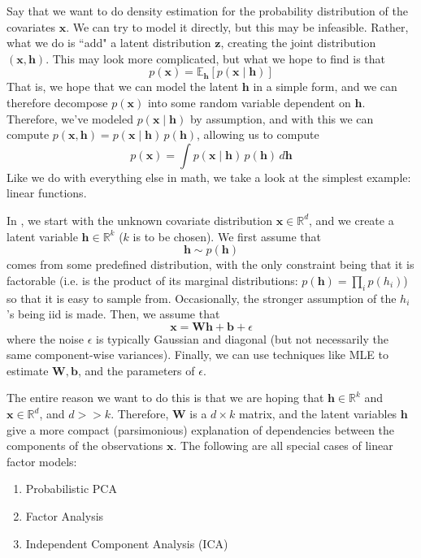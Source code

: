 \documentclass{article}
\theoremstyle{definition}
\theoremstyle{remark}
\theoremstyle{definition}
\begin{document}
        Say that we want to do density estimation for the probability distribution of the covariates $\mathbf{x}$. We can try to model it directly, but this may be infeasible. Rather, what we do is ``add" a latent distribution $\mathbf{z}$, creating the joint distribution $(\mathbf{x}, \mathbf{h})$. This may look more complicated, but what we hope to find is that 
        \[p(\mathbf{x}) = \mathbb{E}_{\mathbf{h}} [ p(\mathbf{x} \mid \mathbf{h})]\]
        That is, we hope that we can model the latent $\mathbf{h}$ in a simple form, and we can therefore decompose $p(\mathbf{x})$ into some random variable dependent on $\mathbf{h}$. Therefore, we've modeled $p(\mathbf{x} \mid \mathbf{h})$ by assumption, and with this we can compute $p(\mathbf{x}, \mathbf{h}) = p( \mathbf{x} \mid \mathbf{h}) \, p( \mathbf{h})$, allowing us to compute 
        \[p( \mathbf{x}) = \int p(\mathbf{x} \mid \mathbf{h}) \, p(\mathbf{h}) \, d\mathbf{h}\]
        Like we do with everything else in math, we take a look at the simplest example: linear functions. 

        In , we start with the unknown covariate distribution $\mathbf{x} \in \mathbb{R}^d$, and we create a latent variable $\mathbf{h} \in \mathbb{R}^k$ ($k$ is to be chosen). We first assume that 
        \[\mathbf{h} \sim p(\mathbf{h})\] 
        comes from some predefined distribution, with the only constraint being that it is factorable (i.e. is the product of its marginal distributions: $p(\mathbf{h}) = \prod_i p(h_i)$) so that it is easy to sample from. Occasionally, the stronger assumption of the $h_i$'s being iid is made. Then, we assume that 
        \[\mathbf{x} = \mathbf{W} \mathbf{h} + \mathbf{b} + \epsilon\] 
        where the noise $\epsilon$ is typically Gaussian and diagonal (but not necessarily the same component-wise variances). Finally, we can use techniques like MLE to estimate $\mathbf{W}, \mathbf{b}$, and the parameters of $\epsilon$.  

        The entire reason we want to do this is that we are hoping that $\mathbf{h} \in \mathbb{R}^k$ and $\mathbf{x} \in \mathbb{R}^d$, and $d >> k$. Therefore, $\mathbf{W}$ is a $d \times k$ matrix, and the latent variables $\mathbf{h}$ give a more compact (parsimonious)  explanation of dependencies between the components of the observations $\mathbf{x}$. The following are all special cases of linear factor models: 
        \begin{enumerate}
            \item Probabilistic PCA
            \item Factor Analysis
            \item Independent Component Analysis (ICA)
        \end{enumerate}
\end{document}
